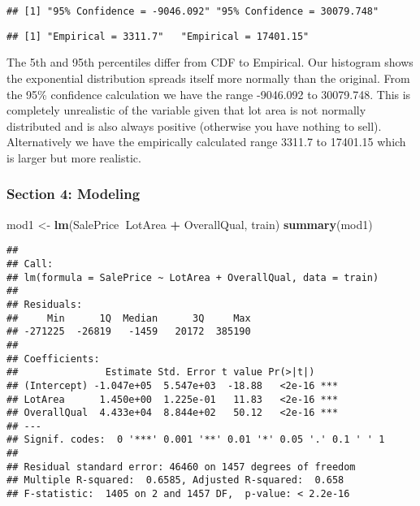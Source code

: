 \documentclass[
]{article}
\newenvironment{Shaded}{\begin{snugshade}}{\end{snugshade}}
\newcommand{\DecValTok}[1]{\textcolor[rgb]{0.00,0.00,0.81}{#1}}
\newcommand{\FloatTok}[1]{\textcolor[rgb]{0.00,0.00,0.81}{#1}}
\newcommand{\KeywordTok}[1]{\textcolor[rgb]{0.13,0.29,0.53}{\textbf{#1}}}
\newcommand{\NormalTok}[1]{#1}
\newcommand{\OperatorTok}[1]{\textcolor[rgb]{0.81,0.36,0.00}{\textbf{#1}}}
\newcommand{\StringTok}[1]{\textcolor[rgb]{0.31,0.60,0.02}{#1}}
\begin{document}
\begin{verbatim}
## [1] "95% Confidence = -9046.092" "95% Confidence = 30079.748"
\end{verbatim}

\begin{Shaded}
\end{Shaded}

\begin{verbatim}
## [1] "Empirical = 3311.7"   "Empirical = 17401.15"
\end{verbatim}

The 5th and 95th percentiles differ from CDF to Empirical. Our histogram
shows the exponential distribution spreads itself more normally than the
original. From the 95\% confidence calculation we have the range
-9046.092 to 30079.748. This is completely unrealistic of the variable
given that lot area is not normally distributed and is also always
positive (otherwise you have nothing to sell). Alternatively we have the
empirically calculated range 3311.7 to 17401.15 which is larger but more
realistic.

\hypertarget{section-4-modeling}{%
\subsubsection{Section 4: Modeling}\label{section-4-modeling}}

\begin{Shaded}
\begin{Highlighting}[]
\NormalTok{mod1 <-}\StringTok{ }\KeywordTok{lm}\NormalTok{(SalePrice}\OperatorTok{~}\NormalTok{LotArea }\OperatorTok{+}\StringTok{ }\NormalTok{OverallQual, train)}
\KeywordTok{summary}\NormalTok{(mod1)}
\end{Highlighting}
\end{Shaded}

\begin{verbatim}
## 
## Call:
## lm(formula = SalePrice ~ LotArea + OverallQual, data = train)
## 
## Residuals:
##     Min      1Q  Median      3Q     Max 
## -271225  -26819   -1459   20172  385190 
## 
## Coefficients:
##               Estimate Std. Error t value Pr(>|t|)    
## (Intercept) -1.047e+05  5.547e+03  -18.88   <2e-16 ***
## LotArea      1.450e+00  1.225e-01   11.83   <2e-16 ***
## OverallQual  4.433e+04  8.844e+02   50.12   <2e-16 ***
## ---
## Signif. codes:  0 '***' 0.001 '**' 0.01 '*' 0.05 '.' 0.1 ' ' 1
## 
## Residual standard error: 46460 on 1457 degrees of freedom
## Multiple R-squared:  0.6585, Adjusted R-squared:  0.658 
## F-statistic:  1405 on 2 and 1457 DF,  p-value: < 2.2e-16
\end{verbatim}
\end{document}
